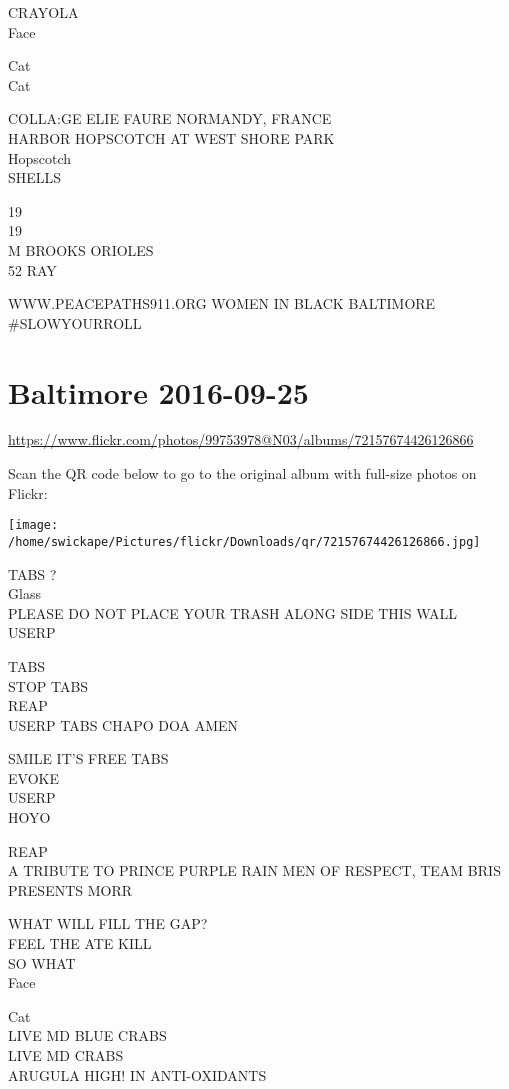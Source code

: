 \documentclass[10pt,letterpaper]{article}
\begin{document}
CRAYOLA\\
Face

Cat\\
Cat

COLLA:GE ELIE FAURE NORMANDY, FRANCE\\
HARBOR HOPSCOTCH AT WEST SHORE PARK\\
Hopscotch\\
SHELLS

19\\
19\\
M BROOKS ORIOLES\\
52 RAY

WWW.PEACEPATHS911.ORG WOMEN IN BLACK BALTIMORE\\
\#SLOWYOURROLL
\pagebreak

\section*{Baltimore 2016-09-25}

\url{https://www.flickr.com/photos/99753978@N03/albums/72157674426126866}

Scan the QR code below to go to the original album with full-size photos on Flickr:

\texttt{[image: /home/swickape/Pictures/flickr/Downloads/qr/72157674426126866.jpg]}
\pagebreak

TABS ?\\
Glass\\
PLEASE DO NOT PLACE YOUR TRASH ALONG SIDE THIS WALL\\
USERP

TABS\\
STOP TABS\\
REAP\\
USERP TABS CHAPO DOA AMEN

SMILE IT'S FREE TABS\\
EVOKE\\
USERP\\
HOYO

REAP\\
A TRIBUTE TO PRINCE PURPLE RAIN MEN OF RESPECT, TEAM BRIS PRESENTS MORR

WHAT WILL FILL THE GAP?\\
FEEL THE ATE KILL\\
SO WHAT\\
Face

Cat\\
LIVE MD BLUE CRABS\\
LIVE MD CRABS\\
ARUGULA HIGH! IN ANTI{-}OXIDANTS
\end{document}
